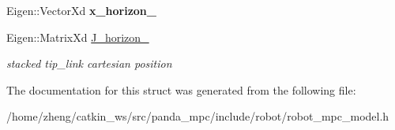 \begin{DoxyCompactItemize}
\mbox{\label{structrobot_1_1_m_p_c__param_a06d64ad4a52459d87ea7e790ee0d2274}} 
Eigen\+::\+Vector\+Xd {\bfseries x\+\_\+horizon\+\_\+}
\item 
\mbox{\label{structrobot_1_1_m_p_c__param_a4739613f4fa8621dc7fa13f2f8955649}} 
Eigen\+::\+Matrix\+Xd \hyperlink{structrobot_1_1_m_p_c__param_a4739613f4fa8621dc7fa13f2f8955649}{J\+\_\+horizon\+\_\+}
\begin{DoxyCompactList}\small\item\em stacked tip\+\_\+link cartesian position \end{DoxyCompactList}\end{DoxyCompactItemize}


The documentation for this struct was generated from the following file\+:\begin{DoxyCompactItemize}
\item 
/home/zheng/catkin\+\_\+ws/src/panda\+\_\+mpc/include/robot/robot\+\_\+mpc\+\_\+model.\+h\end{DoxyCompactItemize}
